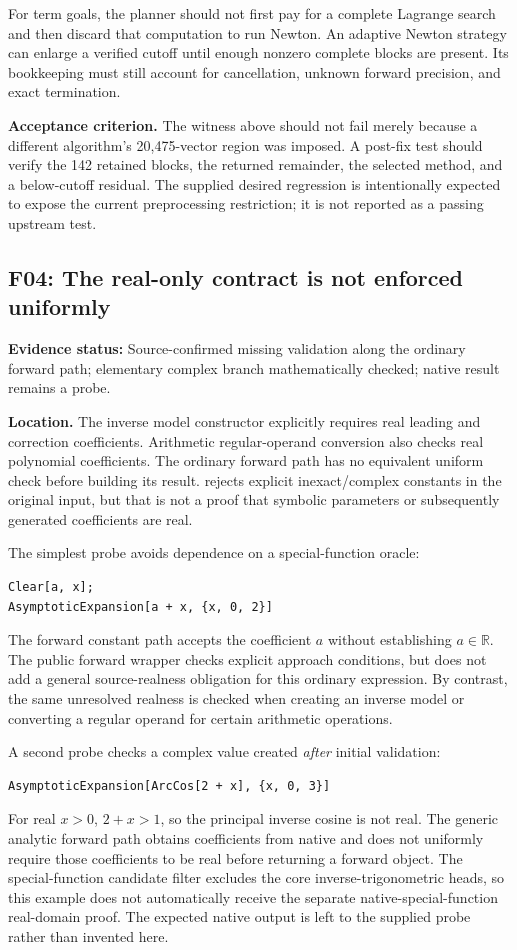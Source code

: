 \documentclass[11pt,a4paper]{article}
\newcommand{\R}{\mathbb R}
\newcommand{\code}[1]{\texttt{\detokenize{#1}}}
\newcommand{\finding}[2]{\subsection{#1: #2}}
\newcommand{\status}[1]{\textbf{Evidence status:} #1.\par}
\begin{document}
For term goals, the planner should not first pay for a complete Lagrange search and then discard that computation to run Newton. An adaptive Newton strategy can enlarge a verified cutoff until enough nonzero complete blocks are present. Its bookkeeping must still account for cancellation, unknown forward precision, and exact termination.

\textbf{Acceptance criterion.} The witness above should not fail merely because a different algorithm's 20,475-vector region was imposed. A post-fix test should verify the 142 retained blocks, the returned remainder, the selected method, and a below-cutoff residual. The supplied desired regression is intentionally expected to expose the current preprocessing restriction; it is not reported as a passing upstream test.

\finding{F04}{The real-only contract is not enforced uniformly}
\status{Source-confirmed missing validation along the ordinary forward path; elementary complex branch mathematically checked; native result remains a probe}

\textbf{Location.} The inverse model constructor \code{rowsToModel} explicitly requires real leading and correction coefficients. Arithmetic regular-operand conversion also checks real polynomial coefficients. The ordinary forward path has no equivalent uniform check before building its result. \code{validateInput} rejects explicit inexact/complex constants in the original input, but that is not a proof that symbolic parameters or subsequently generated coefficients are real.\cite{core,arithmetic}

The simplest probe avoids dependence on a special-function oracle:
\begin{lstlisting}
Clear[a, x];
AsymptoticExpansion[a + x, {x, 0, 2}]
\end{lstlisting}
The forward constant path accepts the coefficient $a$ without establishing $a\in\R$. The public forward wrapper checks explicit approach conditions, but does not add a general source-realness obligation for this ordinary expression. By contrast, the same unresolved realness is checked when creating an inverse model or converting a regular operand for certain arithmetic operations.

A second probe checks a complex value created \emph{after} initial validation:
\begin{lstlisting}
AsymptoticExpansion[ArcCos[2 + x], {x, 0, 3}]
\end{lstlisting}
For real $x>0$, $2+x>1$, so the principal inverse cosine is not real. The generic analytic forward path obtains coefficients from native \code{Series} and does not uniformly require those coefficients to be real before returning a forward object. The special-function candidate filter excludes the core inverse-trigonometric heads, so this example does not automatically receive the separate native-special-function real-domain proof. The expected native output is left to the supplied probe rather than invented here.\cite{core,expressions,native}
\end{document}
